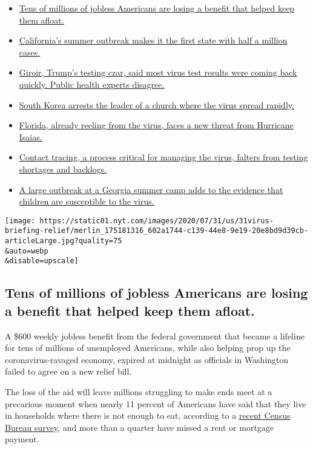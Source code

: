 \begin{itemize}
\tightlist
\item
  \protect\hyperlink{link-7c4d159d}{Tens of millions of jobless
  Americans are losing a benefit that helped keep them afloat.}
\item
  \protect\hyperlink{link-4e17d805}{California's summer outbreak makes
  it the first state with half a million cases.}
\item
  \protect\hyperlink{link-65fa7f74}{Giroir, Trump's testing czar, said
  most virus test results were coming back quickly. Public health
  experts disagree.}
\item
  \protect\hyperlink{link-2b88e858}{South Korea arrests the leader of a
  church where the virus spread rapidly.}
\item
  \protect\hyperlink{link-3bb771a7}{Florida, already reeling from the
  virus, faces a new threat from Hurricane Isaias.}
\item
  \protect\hyperlink{link-747b61fb}{Contact tracing, a process critical
  for managing the virus, falters from testing shortages and backlogs.}
\item
  \protect\hyperlink{link-19b57b6f}{A large outbreak at a Georgia summer
  camp adds to the evidence that children are susceptible to the virus.}
\end{itemize}

\texttt{[image: https://static01.nyt.com/images/2020/07/31/us/31virus-briefing-relief/merlin\_175181316\_602a1744-c139-44e8-9e19-20e8bd9d39cb-articleLarge.jpg?quality=75\\\&auto=webp\\\&disable=upscale]}

\hypertarget{tens-of-millions-of-jobless-americans-are-losing-a-benefit-that-helped-keep-them-afloat}{%
\subsection{Tens of millions of jobless Americans are losing a benefit
that helped keep them
afloat.}\label{tens-of-millions-of-jobless-americans-are-losing-a-benefit-that-helped-keep-them-afloat}}

A \$600 weekly jobless benefit from the federal government that became a
lifeline for tens of millions of unemployed Americans, while also
helping prop up the coronavirus-ravaged economy, expired at midnight as
officials in Washington failed to agree on a new relief bill.

The loss of the aid will leave millions struggling to make ends meet at
a precarious moment when nearly 11 percent of Americans have said that
they live in households where there is not enough to eat, according to a
\href{https://www.census.gov/programs-surveys/household-pulse-survey/data.html?utm_campaign=20200727mspuls1ccdtanl\&utm_medium=email\&utm_source=govdelivery}{recent
Census Bureau survey}, and more than a quarter have missed a rent or
mortgage payment.

